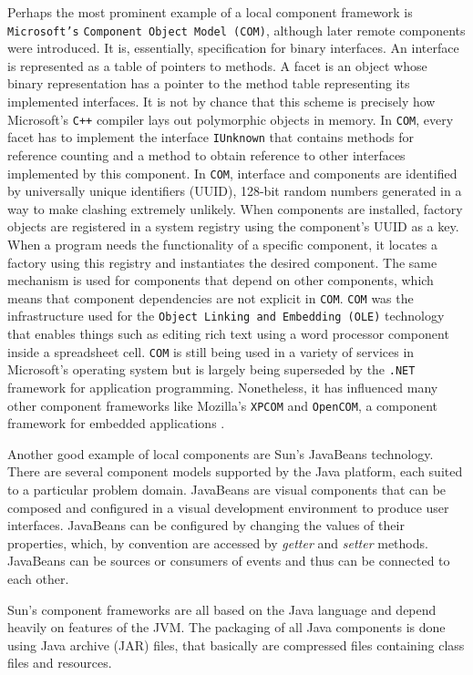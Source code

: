 Perhaps the most prominent example of a local component framework is \texttt{Microsoft's} \texttt{Component Object Model (COM)}, although
later remote components were introduced. It is, essentially, specification for binary interfaces. An interface is represented as a table of
pointers to methods. A facet is an object whose binary representation has a pointer to the method table representing its implemented interfaces.
It is not by chance that this scheme is precisely how Microsoft's \texttt{C++} compiler lays out polymorphic objects in memory.
In \texttt{COM}, every facet has to implement the interface \texttt{IUnknown} that contains methods for reference counting and a method
to obtain reference to other interfaces implemented by this component. In \texttt{COM}, interface and components are identified by
universally unique identifiers (UUID), 128-bit random numbers generated in a way to make clashing extremely unlikely.
When components are installed, factory objects are registered in a system registry using the component's UUID as a key.
When a program needs the functionality of a specific component, it locates a factory using this registry and instantiates the desired component.
The same mechanism is used for components that depend on other components, which means that component dependencies are not explicit
in \texttt{COM}. \texttt{COM} was the infrastructure used for the \texttt{Object Linking and Embedding (OLE)} technology that enables
things such as editing rich text using a word processor component inside a spreadsheet cell. \texttt{COM} is still being used
in a variety of services in Microsoft's operating system but is largely being superseded by the \texttt{.NET} framework for application
programming. Nonetheless, it has influenced many other component frameworks like Mozilla's \texttt{XPCOM} and \texttt{OpenCOM}, a component
framework for embedded applications \cite{XPCOM} \cite{OpenCOM01}.

Another good example of local components are Sun's JavaBeans technology. There are several component models supported by the Java platform, each
suited to a particular problem domain. JavaBeans are visual components that can be composed and configured in a visual development environment
to produce user interfaces. JavaBeans can be configured by changing the values of their properties, which, by convention are accessed by \emph{getter}
and \emph{setter} methods. JavaBeans can be sources or consumers of events and thus can be connected to each other. 

Sun's component frameworks are all based on the Java language and depend heavily on features of the JVM. The packaging of all Java components is
done using Java archive (JAR) files, that basically are compressed files containing class files and resources.

